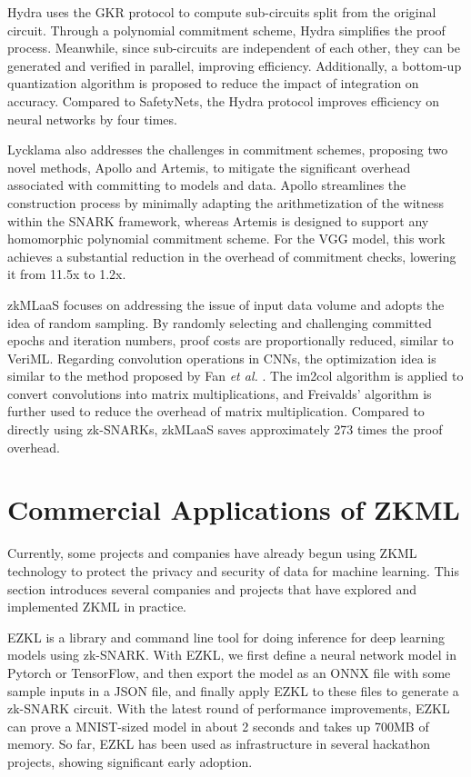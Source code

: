 \documentclass[journal]{IEEEtran}
\begin{document}
Hydra \cite{zhang2021hydra} uses the GKR protocol to compute sub-circuits split from the original circuit. Through a polynomial commitment scheme, Hydra simplifies the proof process. Meanwhile, since sub-circuits are independent of each other, they can be generated and verified in parallel, improving efficiency. Additionally, a bottom-up quantization algorithm is proposed to reduce the impact of integration on accuracy. Compared to SafetyNets, the Hydra protocol improves efficiency on neural networks by four times.

Lycklama \cite{lycklama2024artemis} also addresses the challenges in commitment schemes, proposing two novel methods, Apollo and Artemis, to mitigate the significant overhead associated with committing to models and data. Apollo streamlines the construction process by minimally adapting the arithmetization of the witness within the SNARK framework, whereas Artemis is designed to support any homomorphic polynomial commitment scheme. For the VGG model, this work achieves a substantial reduction in the overhead of commitment checks, lowering it from 11.5x to 1.2x.


zkMLaaS \cite{huang2022zkmlaas} focuses on addressing the issue of input data volume and adopts the idea of random sampling. By randomly selecting and challenging committed epochs and iteration numbers, proof costs are proportionally reduced, similar to VeriML. Regarding convolution operations in CNNs, the optimization idea is similar to the method proposed by Fan  \emph{et al. }\cite{fan2023validating}. The im2col algorithm is applied to convert convolutions into matrix multiplications, and Freivalds' algorithm is further used to reduce the overhead of matrix multiplication. Compared to directly using zk-SNARKs, zkMLaaS saves approximately 273 times the proof overhead.


\section{Commercial Applications of ZKML}\label{s:4}

Currently, some projects and companies have already begun using ZKML technology to protect the privacy and security of data for machine learning. This section introduces several companies and projects that have explored and implemented ZKML in practice.

EZKL \cite{cryptoeprint:2020:352} is a library and command line tool for doing inference for deep learning models using zk-SNARK. With EZKL, we first define a neural network model in Pytorch or TensorFlow, and then export the model as an ONNX file with some sample inputs in a JSON file, and finally apply EZKL to these files to generate a zk-SNARK circuit. With the latest round of performance improvements, EZKL can prove a MNIST-sized model in about 2 seconds and takes up 700MB of memory. So far, EZKL has been used as infrastructure in several hackathon projects, showing significant early adoption.
\end{document}

